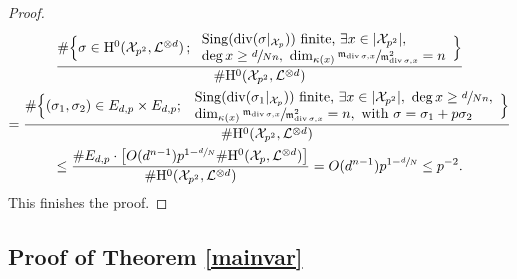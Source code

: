 \documentclass[11pt]{article}
\numberwithin{equation}{section}
\newcommand{\sep}{\,;\,}
\theoremstyle{plain}
\theoremstyle{definition}
\newcommand{\ho}{\mathrm{H}}
\newcommand{\X}{\mathcal{X}}
\newcommand{\li}{\mathcal{L}}
\begin{document}
\begin{proof}
\begin{multline*}
\frac{\#
\Bigl\{ \sigma\in \ho^0(\X_{p^2}, \li^{\otimes d})\sep \begin{array}{ll}
\mathrm{Sing}(\div (\sigma|_{\X_p})) \text{ finite,}\ \exists x\in |\X_{p^2}|,\\ \deg x\geq \sfrac{d}{Nn},\ \dim_{\kappa(x)}\sfrac{\mathfrak{m}_{\div \sigma,x}}{\mathfrak{m}_{\div \sigma,x}^2}=n
\end{array} \Bigr\}}{\#\ho^0(\X_{p^2}, \li^{\otimes d})}\\
=\frac{\#\Bigl\{ (\sigma_1,\sigma_2)\in E_{d,p}\times E_{d,p};\
\begin{array}{ll}
\mathrm{Sing}(\div (\sigma_1|_{\X_p})) \text{ finite,}\ \exists x\in |\X_{p^2}|,\ \deg x\geq \sfrac{d}{Nn}, \\ \dim_{\kappa(x)}\sfrac{\mathfrak{m}_{\div \sigma,x}}{\mathfrak{m}_{\div \sigma,x}^2}=n, \text{ with }\sigma=\sigma_1+p\sigma_2
\end{array}
\Bigr\}}{\#\ho^0(\X_{p^2}, \li^{\otimes d})}\\
\leq \frac{\#E_{d,p}\cdot \bigl[O(d^{n-1}) p^{1-\sfrac{d}{N}}\#\ho^0(\X_p, \li^{\otimes d})\bigr]}{\#\ho^0(\X_{p^2}, \li^{\otimes d})}=O(d^{n-1}) p^{1-\sfrac{d}{N}}\leq p^{-2}.
\end{multline*}
This finishes the proof.
\end{proof}

\subsection{Proof of Theorem \ref{mainvar}}\label{finalarakelov}
\end{document}
